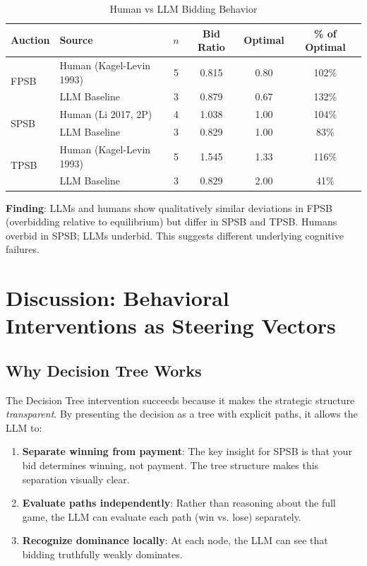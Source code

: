 \documentclass[12pt]{article}
\begin{document}
\begin{table}[h]
\centering
\caption{Human vs LLM Bidding Behavior}
\label{tab:human_comparison}
\begin{tabular}{llcccc}
\toprule
Auction & Source & $n$ & Bid Ratio & Optimal & \% of Optimal \\
\midrule
\multirow{2}{*}{FPSB} & Human (Kagel-Levin 1993) & 5 & 0.815 & 0.80 & 102\% \\
& LLM Baseline & 3 & 0.879 & 0.67 & 132\% \\
\midrule
\multirow{2}{*}{SPSB} & Human (Li 2017, 2P) & 4 & 1.038 & 1.00 & 104\% \\
& LLM Baseline & 3 & 0.829 & 1.00 & 83\% \\
\midrule
\multirow{2}{*}{TPSB} & Human (Kagel-Levin 1993) & 5 & 1.545 & 1.33 & 116\% \\
& LLM Baseline & 3 & 0.829 & 2.00 & 41\% \\
\bottomrule
\end{tabular}
\end{table}

\textbf{Finding}: LLMs and humans show qualitatively similar deviations in FPSB (overbidding relative to equilibrium) but differ in SPSB and TPSB. Humans overbid in SPSB; LLMs underbid. This suggests different underlying cognitive failures.

\section{Discussion: Behavioral Interventions as Steering Vectors}

\subsection{Why Decision Tree Works}

The Decision Tree intervention succeeds because it makes the strategic structure \emph{transparent}. By presenting the decision as a tree with explicit paths, it allows the LLM to:

\begin{enumerate}
    \item \textbf{Separate winning from payment}: The key insight for SPSB is that your bid determines winning, not payment. The tree structure makes this separation visually clear.

    \item \textbf{Evaluate paths independently}: Rather than reasoning about the full game, the LLM can evaluate each path (win vs. lose) separately.

    \item \textbf{Recognize dominance locally}: At each node, the LLM can see that bidding truthfully weakly dominates.
\end{enumerate}
\end{document}
